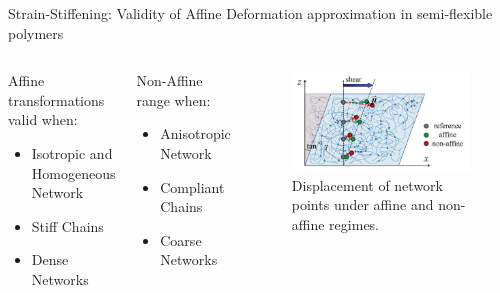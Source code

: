 \documentclass[9pt]{beamer}
\begin{document}
\begin{frame}{Strain-Stiffening: Validity of Affine Deformation approximation in semi-flexible polymers}
  \begin{columns}[onlytextwidth]
    \begin{exampleblock}{Affine transformations valid when: }
      \begin{itemize}
        \item Isotropic and Homogeneous Network
        \item Stiff Chains
        \item Dense Networks
      \end{itemize}
    \end{exampleblock}
    \begin{alertblock}{Non-Affine range when:}
      \begin{itemize}
        \item Anisotropic Network
        \item Compliant Chains
        \item Coarse Networks
      \end{itemize}
      \footnotesize{\citep{wilhelm_elasticity_2003}}
    \end{alertblock}
      \begin{figure}[htpb]
        \centering
        \includegraphics[width=0.99\textwidth]{./Figures/nonaffine.png}
        \caption*{Displacement of network points under affine and non-affine regimes. \footnotesize{\citep{basu_nonaffine_2011, wen_non-affine_2012}}}
      \end{figure}
  \end{columns}
\end{frame}
\end{document}
